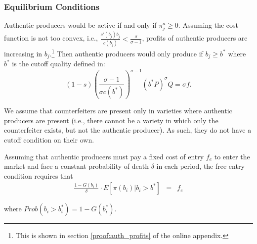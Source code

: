 \documentclass[12pt]{article}
\begin{document}
\subsubsection{Equilibrium Conditions}

Authentic producers would be active if and only if $\pi_{j}^{a}\geq0$. Assuming the cost function is not too convex, i.e., $\frac{c'(b_j)b_j }{c(b_j)}<\frac{\sigma}{\sigma-1}$, profits of authentic producers are increasing in $b_j$.\footnote{This is shown in section \ref{proof:auth_profits} of the online appendix.} Then authentic producers would only produce if $b_{j}\geq b^{*}$ where $b^{*}$ is the cutoff quality defined in:
\begin{equation}
(1-s)\left(\frac{\sigma-1}{\sigma c(b^{*})}\right)^{\sigma-1}\left(b^{*}P\right)^{\sigma}Q=\sigma f.
\end{equation}

We assume that counterfeiters are present only in varieties where authentic producers are present (i.e., there cannot be a variety in which only the counterfeiter exists, but not the authentic producer). As such, they do not have a cutoff condition on their own. 

Assuming that authentic producers must pay a fixed cost of entry $f_{e}$ to enter the market and face a constant probability of death $\delta$ in each period, the free entry condition requires that
\begin{eqnarray} \label{eq:zeroprofit_general}
    \frac{1 - G(b_i)}{\delta}  \cdot E\left[\left. \pi(b_i) \right| b_i > b^{\ast}  \right]   & = & f_e
\end{eqnarray}

\noindent where $Prob(b_i > b_i^{\ast}) = 1 - G(b_i^{\ast})$.

\begin{comment}
The free entry condition can be rewritten as
\begin{eqnarray}  \label{eqn:fe_tm}
            \frac{f (1 - G(b_i^{\ast}))}{\delta } \left( \frac{\tilde{b_i}^{\sigma}c(\tilde{b_i})^{1-\sigma} }{(b_i^{\ast})^{\sigma} ({c(b_i^{\ast})})^{1-\sigma}}  - 1 \right)&=& f_e
\end{eqnarray}

\end{comment}
\end{document}
